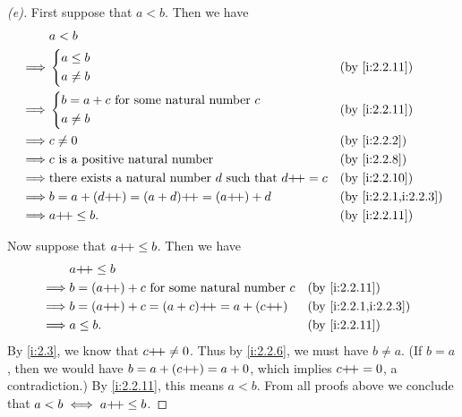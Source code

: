 \begin{proof}[(e)]
  First suppose that \(a < b\).
  Then we have
  \begin{align*}
             & a < b                                                                                         \\
    \implies & \begin{dcases}
                 a \leq b \\
                 a \neq b
               \end{dcases}                                                      &  & \by{i:2.2.11}          \\
    \implies & \begin{dcases}
                 b = a + c \text{ for some natural number } c \\
                 a \neq b
               \end{dcases}                     &  & \by{i:2.2.11}                                           \\
    \implies & c \neq 0                                                            &  & \by{i:2.2.2}         \\
    \implies & c \text{ is a positive natural number}                              &  & \by{i:2.2.8}         \\
    \implies & \text{there exists a natural number } d \text{ such that } d\pp = c &  & \by{i:2.2.10}        \\
    \implies & b = a + (d\pp) = (a + d)\pp = (a\pp) + d                            &  & \by{i:2.2.1,i:2.2.3} \\
    \implies & a\pp \leq b.                                                        &  & \by{i:2.2.11}
  \end{align*}

  Now suppose that \(a{+}\!{+} \leq b\).
  Then we have
  \begin{align*}
             & a\pp \leq b                                                                 \\
    \implies & b = (a\pp) + c \text{ for some natural number } c &  & \by{i:2.2.11}        \\
    \implies & b = (a\pp) + c = (a + c)\pp = a + (c\pp)          &  & \by{i:2.2.1,i:2.2.3} \\
    \implies & a \leq b.                                         &  & \by{i:2.2.11}
  \end{align*}
  By \cref{i:2.3}, we know that \(c{+}\!{+} \neq 0\).
  Thus by \cref{i:2.2.6}, we must have \(b \neq a\).
  (If \(b = a\), then we would have \(b = a + (c{+}\!{+}) = a + 0\), which implies \(c{+}\!{+} = 0\), a contradiction.)
  By \cref{i:2.2.11}, this means \(a < b\).
  From all proofs above we conclude that \(a < b \iff a{+}\!{+} \leq b\).
\end{proof}

